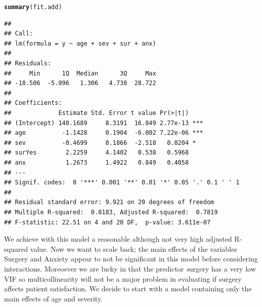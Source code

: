 \documentclass{article}\usepackage[]{graphicx}\usepackage[]{color}
\makeatletter
\newcommand{\hlstd}[1]{\textcolor[rgb]{0.345,0.345,0.345}{#1}}%
\newcommand{\hlkwd}[1]{\textcolor[rgb]{0.737,0.353,0.396}{\textbf{#1}}}%
\newenvironment{kframe}{%
 \def\at@end@of@kframe{}%
 \ifinner\ifhmode%
  \def\at@end@of@kframe{\end{minipage}}%
  \begin{minipage}{\columnwidth}%
 \fi\fi%
 \def\FrameCommand##1{\hskip\@totalleftmargin \hskip-\fboxsep
 \colorbox{shadecolor}{##1}\hskip-\fboxsep
     \hskip-\linewidth \hskip-\@totalleftmargin \hskip\columnwidth}%
 \MakeFramed {\advance\hsize-\width
   \@totalleftmargin\z@ \linewidth\hsize
   \@setminipage}}%
 {\par\unskip\endMakeFramed%
 \at@end@of@kframe}
\newenvironment{knitrout}{}{} %
\makeatother
\begin{document}
\begin{knitrout}
\color{fgcolor}\begin{kframe}
\begin{alltt}
\hlkwd{summary}\hlstd{(fit.add)}
\end{alltt}
\begin{verbatim}
## 
## Call:
## lm(formula = y ~ age + sev + sur + anx)
## 
## Residuals:
##     Min      1Q  Median      3Q     Max 
## -18.506  -5.096   1.306   4.738  28.722 
## 
## Coefficients:
##             Estimate Std. Error t value Pr(>|t|)    
## (Intercept) 140.1689     8.3191  16.849 2.77e-13 ***
## age          -1.1428     0.1904  -6.002 7.22e-06 ***
## sev          -0.4699     0.1866  -2.518   0.0204 *  
## surYes        2.2259     4.1402   0.538   0.5968    
## anx           1.2673     1.4922   0.849   0.4058    
## ---
## Signif. codes:  0 '***' 0.001 '**' 0.01 '*' 0.05 '.' 0.1 ' ' 1
## 
## Residual standard error: 9.921 on 20 degrees of freedom
## Multiple R-squared:  0.8183,	Adjusted R-squared:  0.7819 
## F-statistic: 22.51 on 4 and 20 DF,  p-value: 3.611e-07
\end{verbatim}
\end{kframe}
\end{knitrout}
\clearpage
We achieve with this model a reasonable although not very high adjusted R-squared value. Now we want to scale back; the main effects of the variables Surgery and Anxiety appear to not be significant in this model before considering interactions. Moreoever we are lucky in that the predictor \textit surgery has a very low VIF  so multicollinearity will not be a major problem in evaluating if surgery affects patient satisfaction. We decide to start with a model containing only the main effects of age and severity.
\end{document}
